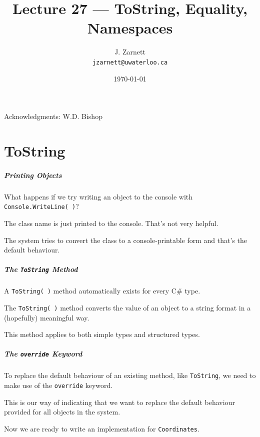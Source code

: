 

\title{Lecture 27 --- ToString, Equality, Namespaces}

\author{J. Zarnett\\
\texttt{jzarnett@uwaterloo.ca}}
\date{\today}



\begin{frame}
  \titlepage
  
  \begin{center}
  \small{Acknowledgments: W.D. Bishop}
  \end{center}
\end{frame}

\part{ToString}
\begin{frame}\partpage\end{frame}


\begin{frame}
\frametitle{Printing Objects}

What happens if we try writing  an object to the console with \texttt{Console.WriteLine( )}?

The class name is just printed to the console. That's not very helpful.

The system tries to convert the class to a console-printable form and that's the default behaviour. 

\end{frame}

\begin{frame}
\frametitle{The \texttt{ToString} Method}
A \texttt{ToString( )} method automatically exists for every C\# type.

The \texttt{ToString( )} method converts the value of an object to a string format in a (hopefully) meaningful way.

This method applies to both simple types and structured types.
\end{frame}

\begin{frame}
\frametitle{The \texttt{override} Keyword}
To replace the default behaviour of an existing method, like \texttt{ToString}, we need to make use of the \alert{\texttt{override}} keyword.

This is our way of indicating that we want to replace the default behaviour provided for all objects in the system.

Now we are ready to write an implementation for \texttt{Coordinates}.

\end{frame}



